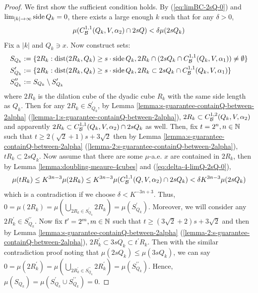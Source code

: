 \begin{proof}
    We first show the sufficient condition holds. By (\ref{eq:limBC-2sQ-0}) and $\lim_{|k|\rightarrow\infty} \operatorname{side} Q_k = 0$, there exists a large enough $k$ such that for any $\delta>0$,
    \begin{equation}
        \mu(C_\mathcal B^{1,1}(Q_k, V, \alpha_2)\cap 2sQ) < \delta\mu(2sQ_k)
    \end{equation}
    Fix a $|k|$ and $Q_k\ni x$. Now construct sets:
    \begin{equation*}
        \begin{split}
            S_{Q_k} &:= \{2R_k: \operatorname{dist}(2R_k, Q_k)\geq s\cdot\operatorname{side} Q_k, 2R_k\cap(2sQ_k\cap C_\mathcal B^{1, 1} (Q_k, V, \alpha_1))\neq \emptyset\} \\
            S_{Q_k}^\prime &:= \{2R_k: \operatorname{dist}(2R_k, Q_k)\geq s\cdot\operatorname{side} Q_k, 2R_k\subset 2sQ_k\cap C_\mathcal B^{1, 1} (Q_k, V, \alpha_1)\} \\
            S_{Q_k}^{\prime\prime} &:= S_{Q_k} \setminus S_{Q_k}^\prime
        \end{split}
    \end{equation*}
    where $2R_k$ is the dilation cube of the dyadic cube $R_k$ with the same side length as $Q_k$. Then for any $2R_k\in S_{Q_k}^\prime$, by Lemma \ref{lemma:s-guarantee-containQ-between-2alpha} (\ref{lemma-1:s-guarantee-containQ-between-2alpha}), $2R_k\subset  C_\mathcal B^{1,2}(Q_k, V, \alpha_2)$ and apparently $2R_k\subset  C_\mathcal B^{1,1}(Q_k, V, \alpha_2)\cap 2sQ_k$ as well. Then, fix $t=2^n, n\in\mathbb{N}$ such that $t\geq 2(\sqrt{2}+1)s + 3\sqrt{2}$ then by Lemma \ref{lemma:s-guarantee-containQ-between-2alpha} (\ref{lemma-2:s-guarantee-containQ-between-2alpha}), $tR_k\subset 2sQ_k$. Now assume that there are some $\mu$-a.e. $x$ are contained in $2R_k$, then by Lemma \ref{lemma:doubling-meaure-4cubes} and (\ref{eq:delta-4-limQ-2sQ-0}), 
    \begin{equation*}
        \mu(tR_k)\leq K^{3n-3}\mu(2R_k)\leq K^{3n-3}\mu(C_\mathcal B^{1,1}(Q, V, \alpha_2)\cap 2sQ_k) < \delta K^{3n-3} \mu(2sQ_k)
    \end{equation*}
    which is a contradiction if we choose $\delta<K^{-3n+3}$. Thus, $0=\mu(2R_k) = \mu(\bigcup_{2R_k\in S_{Q_k}^\prime} 2R_k) = \mu(S_{Q_k}^\prime)$. Moreover, we will consider any $2R_k^\prime\in S^{\prime\prime}_{Q_k}$. Now fix $t^\prime = 2^m, m\in\mathbb{N}$ such that $t\geq (3\sqrt{2}+2)s + 3\sqrt{2}$ and then by Lemma \ref{lemma:s-guarantee-containQ-between-2alpha} (\ref{lemma-2:s-guarantee-containQ-between-2alpha}), $2R_k^\prime \subset  3sQ_k \subset t^\prime R_k$. Then with the similar contradiction proof noting that $\mu(2sQ_k)\leq \mu(3sQ_k)$, we can say $0=\mu(2R_k^\prime) = \mu(\bigcup_{2R_k^\prime\in S_{Q_k}^{\prime\prime}} 2R_k^\prime) = \mu(S_{Q_k}^{\prime\prime})$. Hence, $\mu(S_{Q_k}) = \mu(S_{Q_k}^\prime \cup S_{Q_k}^{\prime\prime}) = 0$. 
    

\end{proof}
